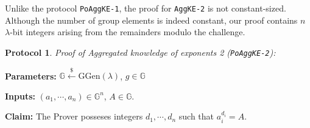 \documentclass[11pt, lettersize, notitlepage, leqno, footskip=0.6cm]{article}
\newcommand{\mb}{\mathbb}
\newcommand{\mr}{\mathrm}
\newcommand{\lam}{\lambda}
\newcommand{\lamb}{\lambda}
\newtheorem{Prot}[Thm]{Protocol}
\numberwithin{equation}{section}
\begin{document}
Unlike the protocol \verb|PoAggKE-1|, the proof for \verb|AggKE-2| is not constant-sized. Although the number of group elements is indeed constant, our proof contains $n$ $\lam$-bit integers arising from the remainders modulo the challenge.

\vspace{0.2cm}

\begin{Prot} \normalfont \textit{Proof of Aggregated knowledge of exponents} 2 (\verb|PoAggKE-2|): \end{Prot}\vspace{-0.25cm}

\noindent \textbf{Parameters:} $\mb{G}\xleftarrow{\$} \mr{GGen}(\lamb)$,\; $g\in \mb{G}$ 

\noindent \textbf{Inputs:} $(a_1,\cdots,a_n) \in \mb{G}^n$, $A\in\mb{G}$.

\noindent \textbf{Claim:} The Prover posseses integers $d_1,\cdots,d_n$ such that $a_i^{d_i} = A$.
\end{document}
